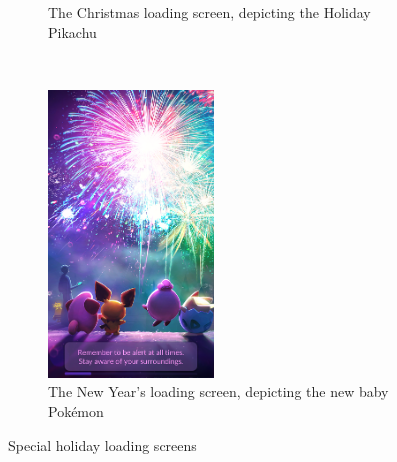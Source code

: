 \begin{figure}[h]
\begin{subfigure}[t]{0.3\textwidth}
		\caption{The Christmas loading screen, depicting the Holiday Pikachu}
	\end{subfigure}
	~
	\begin{subfigure}[t]{0.3\textwidth}
		\includegraphics[height=3in]{Figures/pogo-loading-screen-newyear}
		\caption{The New Year's loading screen, depicting the new baby Pokémon}
	\end{subfigure}
	\caption{Special holiday loading screens}
\end{figure}

